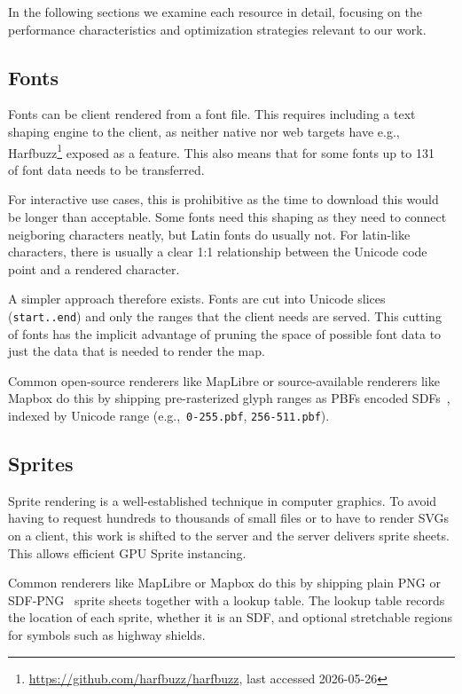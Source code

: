 In the following sections we examine each resource in detail, focusing on the performance characteristics and optimization strategies relevant to our work.

\subsection{Fonts}

Fonts can be client rendered from a font file.
This requires including a text shaping engine to the client, as neither native nor web targets have e.g., Harfbuzz\footnote{\url{https://github.com/harfbuzz/harfbuzz}, last accessed 2026-05-26} exposed as a feature.
This also means that for some fonts up to \qty{131}{\mega\byte}\cite{FontThatIncludes} of font data needs to be transferred.

For interactive use cases, this is prohibitive as the time to download this would be longer than acceptable.
Some fonts need this shaping as they need to connect neigboring characters neatly, but Latin fonts do usually not.
For latin-like characters, there is usually a clear 1:1 relationship between the Unicode code point and a rendered character.

A simpler approach therefore exists.
Fonts are cut into Unicode slices (\texttt{start..end}) and only the ranges that the client needs are served.
This cutting of fonts has the implicit advantage of pruning the space of possible font data to just the data that is needed to render the map.

Common open-source renderers like MapLibre or source-available renderers like Mapbox do this by shipping pre-rasterized glyph ranges as \acp{PBF} encoded \acp{SDF}~\cite{greenImprovedAlphatestedMagnification2007}, indexed by Unicode range (e.g.,\ \texttt{0-255.pbf}, \texttt{256-511.pbf}).

\subsection{Sprites}

Sprite rendering is a well-established technique in computer graphics.
To avoid having to request hundreds to thousands of small files or to have to render SVGs on a client, this work is shifted to the server and the server delivers sprite sheets.
This allows efficient \ac{GPU} Sprite instancing.

Common renderers like MapLibre or Mapbox do this by shipping plain \ac{PNG} or \acs{SDF}-\acs{PNG}~\cite{greenImprovedAlphatestedMagnification2007} sprite sheets together with a lookup table.
The lookup table records the location of each sprite, whether it is an SDF, and optional stretchable regions for symbols such as highway shields.

